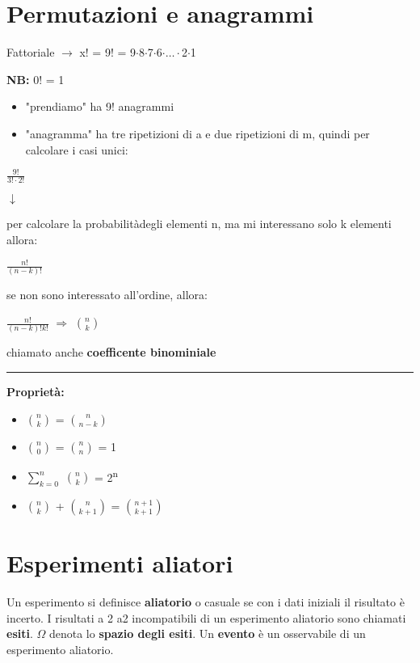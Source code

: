 \documentclass[12pt, a4paper]{article}
\def\SP#1{\textsuperscript{#1}}
\def\separator{\begin{center}    \rule{100pt}{0.5pt}\end{center}}
\begin{document}
\section{Permutazioni e anagrammi}

Fattoriale $\rightarrow$ x! = 9! = 9$\cdot$8$\cdot$7$\cdot$6$\cdot\dots\cdot$2$\cdot$1

\textbf{NB:} 0! = 1

\begin{itemize}
    \item "prendiamo" ha 9! anagrammi
    \item "anagramma" ha tre ripetizioni di a e due ripetizioni di m, quindi per calcolare i casi unici:   
\end{itemize}
\begin{center}
    \Large $\frac{9!}{3!{\cdot}2!}$ \normalsize

    $\downarrow$
 \end{center} 
per calcolare la probabilitàdegli elementi n, ma mi interessano solo k elementi allora:
\begin{center}
    \Large $\frac{n!}{(n-k)!}$ \normalsize
\end{center}
se non sono interessato all'ordine, allora:
\begin{center}
    \Large $\frac{n!}{(n-k)!k!}$ $\Rightarrow$ $\binom{n}{k}$ \normalsize
\end{center}
chiamato anche \textbf{coefficente binominiale}

\separator

\textbf{Proprietà:}
\begin{itemize}
    \item $\binom{n}{k}$ = $\binom{n}{n-k}$
    \item $\binom{n}{0}$ = $\binom{n}{n}$ = 1
    \item $\sum_{k=0}^{n}$ $\binom{n}{k}$  = 2\SP{n}
    \item $\binom{n}{k}$ + $\binom{n}{k+1}$ = $\binom{n+1}{k+1}$  
\end{itemize}




\section{Esperimenti aliatori}

Un esperimento si definisce \textbf{aliatorio} o casuale se con i dati iniziali il risultato è incerto.
I risultati a 2 a2 incompatibili di un esperimento aliatorio sono chiamati \textbf{esiti}.
$\Omega$ denota lo \textbf{spazio degli esiti}.
Un \textbf{evento} è un osservabile di un esperimento aliatorio.
\end{document}
